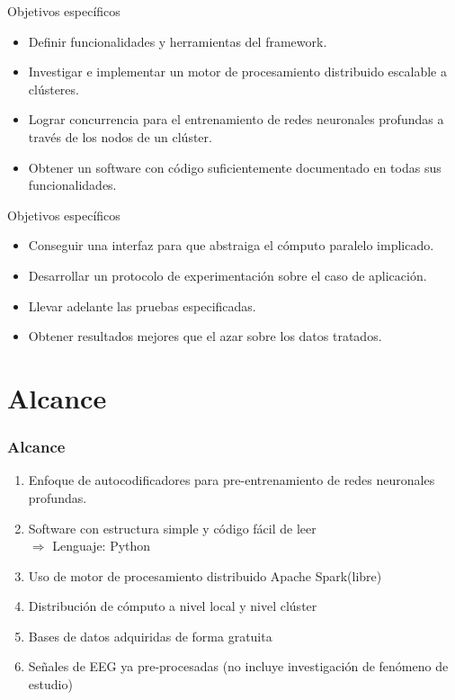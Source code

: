 \begin{frame}[t,fragile]{Objetivos espec\'ificos}
	\begin{block}{}
		\begin{itemize}
			\item Definir funcionalidades y herramientas del framework.
			\item Investigar e implementar un motor de procesamiento distribuido escalable a cl\'usteres.
			\item Lograr concurrencia para el entrenamiento de redes neuronales profundas a trav\'es
			de los nodos de un cl\'uster.
			\item Obtener un software con c\'odigo suficientemente documentado en todas sus
			funcionalidades.
		\end{itemize}
	\end{block}
\end{frame}
\begin{frame}[t,fragile]{Objetivos espec\'ificos}
	\begin{block}{}
		\begin{itemize}
			\item Conseguir una interfaz para que abstraiga el c\'omputo paralelo
			implicado.
			\item Desarrollar un protocolo de experimentaci\'on sobre el caso de aplicaci\'on.
			\item Llevar adelante las pruebas especificadas.
			\item Obtener resultados mejores que el azar sobre los datos tratados.
		\end{itemize}
	\end{block}
\end{frame}

\section{Alcance}
\begin{frame}[t,fragile]
	\frametitle {Alcance}
	\begin{enumerate}
		\item Enfoque de autocodificadores para pre-entrenamiento de redes neuronales profundas.
		\pause
		\item Software con estructura simple y c\'odigo f\'acil de leer\\ $\Rightarrow$ Lenguaje: Python
		\pause
		\item Uso de motor de procesamiento distribuido Apache Spark\texttrademark (libre)
		\pause
		\item Distribuci\'on de c\'omputo a nivel local y nivel cl\'uster
		\pause
		\item Bases de datos adquiridas de forma gratuita
		\pause
		\item Se\~nales de EEG ya pre-procesadas (no incluye investigaci\'on de fen\'omeno de estudio)
		
	\end{enumerate}
	
\end{frame}

